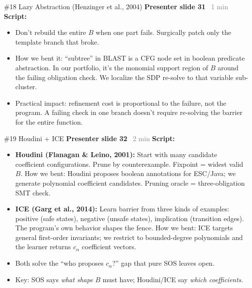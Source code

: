 \documentclass[aspectratio=169]{beamer}
\newcommand{\syncline}[2]{\textbf{#1} \hfill \textcolor{gray}{#2}}
\begin{document}
\begin{frame}{\#18 Lazy Abstraction (Henzinger et al., 2004)}
\syncline{Presenter slide 31}{~1 min}
\textbf{Script:}
\begin{itemize}
  \item Don't rebuild the entire $B$ when one part fails. Surgically patch only the template branch that broke.
  \item How we bent it: ``subtree'' in BLAST is a CFG node set in boolean predicate abstraction. In our portfolio, it's the monomial support region of $B$ around the failing obligation check. We localize the SDP re-solve to that variable sub-cluster.
  \item Practical impact: refinement cost is proportional to the failure, not the program. A failing check in one branch doesn't require re-solving the barrier for the entire function.
\end{itemize}
\end{frame}


\begin{frame}{\#19 Houdini + ICE}
\syncline{Presenter slide 32}{~2 min}
\textbf{Script:}
\begin{itemize}
  \item \textbf{Houdini (Flanagan \& Leino, 2001):} Start with many candidate coefficient configurations. Prune by counterexample. Fixpoint = widest valid $B$. How we bent: Houdini proposes boolean annotations for ESC/Java; we generate polynomial coefficient candidates. Pruning oracle = three-obligation SMT check.
  \item \textbf{ICE (Garg et al., 2014):} Learn barrier from three kinds of examples: positive (safe states), negative (unsafe states), implication (transition edges). The program's own behavior shapes the fence. How we bent: ICE targets general first-order invariants; we restrict to bounded-degree polynomials and the learner returns $c_\alpha$ coefficient vectors.
  \item Both solve the ``who proposes $c_\alpha$?'' gap that pure SOS leaves open.
  \item Key: SOS says \emph{what shape} $B$ must have; Houdini/ICE say \emph{which coefficients}.
\end{itemize}
\end{frame}
\end{document}
